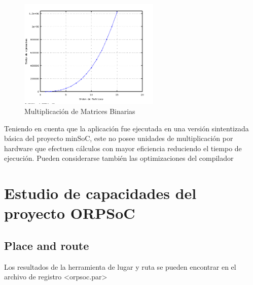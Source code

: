 \begin{figure}[h!]
 	\begin{center}
  	\includegraphics[width=0.6\textwidth,keepaspectratio=true]{./images/matrices}
  	\caption{Multiplicación de Matrices Binarias}
  	\label{fig:mulmat}
 	\end{center}
	\end{figure}

		Teniendo en cuenta que la aplicación fue ejecutada en una versión sintentizada básica del proyecto minSoC, este no posee unidades de multiplicación
		por hardware que efectuen cálculos con mayor eficiencia reduciendo el tiempo de ejecución. Pueden considerarse también las optimizaciones del
		compilador 


\newpage
	\section{Estudio de capacidades del proyecto ORPSoC}

		\subsection{Place and route}	
Los resultados de la herramienta de lugar y ruta se pueden encontrar en el archivo de registro <orpsoc.par>

